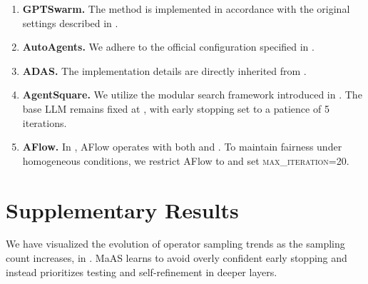 \documentclass{article}
\theoremstyle{plain}
\theoremstyle{definition}
\theoremstyle{remark}
\newcommand{\ourmethod}{{{MaAS}}\xspace}
\newcommand{\llmname}[1]{{\fontfamily{pcr}\selectfont {#1}}\xspace}
\begin{document}
\begin{enumerate}
    \item \textbf{GPTSwarm.} The method is implemented in accordance with the original settings described in \cite{zhuge2024gptswarm}.  

    \item \textbf{AutoAgents.} We adhere to the official configuration specified in \cite{chen2023autoagents}.  

    \item \textbf{ADAS.} The implementation details are directly inherited from \cite{hu2024adas}.  

    \item \textbf{AgentSquare.} We utilize the modular search framework introduced in \cite{shang2024agentsquare}. The base LLM remains fixed at \llmname{gpt-4o-mini}, with early stopping set to a patience of 5 iterations.  

    \item \textbf{AFlow.} In \cite{zhang2024aflow}, AFlow operates with both \llmname{gpt-4o-mini} and \llmname{claude-3.5-sonnet}. To maintain fairness under homogeneous conditions, we restrict AFlow to \llmname{gpt-4o-mini} and set \textsc{max\_iteration}=20.  
\end{enumerate}  


\section{Supplementary Results}
\label{app:exp-result}

We have visualized the evolution of operator sampling trends as the sampling count increases, in . \ourmethod learns to avoid overly confident early stopping and instead prioritizes testing and self-refinement in deeper layers.
\end{document}
